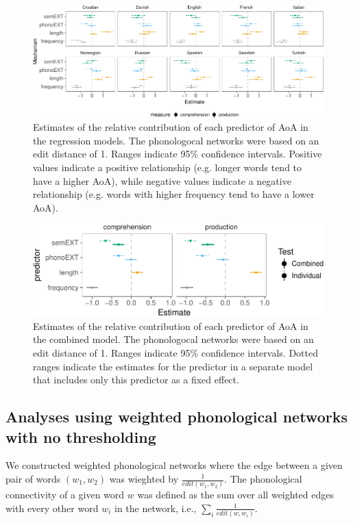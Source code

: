\documentclass[english,floatsintext,man]{apa6}
\theoremstyle{definition}
\theoremstyle{definition}
\theoremstyle{definition}
\theoremstyle{remark}
\begin{document}
\begin{figure}[!h]
\includegraphics[width=\textwidth]{ms_files/figure-latex/staticPredEdit1-1} \caption{Estimates of the relative contribution of each predictor of AoA in the regression models. The phonologocal networks were based on an edit distance of 1. Ranges indicate 95\% confidence intervals. Positive values indicate a positive relationship (e.g. longer words tend to have a higher AoA), while negative values indicate a negative relationship (e.g. words with higher frequency tend to have a lower AoA).}\label{fig:staticPredEdit1}
\end{figure}

\begin{figure}[!h]
\includegraphics[width=\textwidth]{ms_files/figure-latex/staticAllEdit-1} \caption{Estimates of the relative contribution of each predictor of AoA in the combined model. The phonologocal networks were based on an edit distance of 1. Ranges indicate 95\% confidence intervals. Dotted ranges indicate the estimates for the predictor in a separate model that includes only this predictor as a fixed effect.}\label{fig:staticAllEdit}
\end{figure}

\subsection{Analyses using weighted phonological networks with no
thresholding}\label{analyses-using-weighted-phonological-networks-with-no-thresholding}

We constructed weighted phonological networks where the edge between a
given pair of words \((w_1, w_2)\) was wieghted by
\(\frac{1}{edit(w_1,w_2)}\). The phonological connectivity of a given
word \(w\) was defined as the sum over all weighted edges with every
other word \(w_i\) in the network, i.e.,
\(\sum_{i} \frac{1}{edit(w,w_i)}\).
\end{document}
